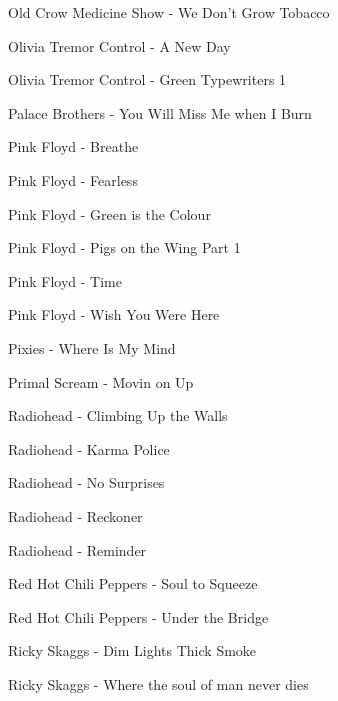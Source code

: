 Old Crow Medicine Show - We Don't Grow Tobacco \dotfill \pageref{We Don't Grow Tobacco - Old Crow Medicine Show} 

Olivia Tremor Control - A New Day \dotfill \pageref{A New Day - Olivia Tremor Control} 

Olivia Tremor Control - Green Typewriters 1 \dotfill \pageref{Green Typewriters 1 - Olivia Tremor Control} 

Palace Brothers - You Will Miss Me when I Burn \dotfill \pageref{You Will Miss Me when I Burn - Palace Brothers} 

Pink Floyd - Breathe \dotfill \pageref{Breathe - Pink Floyd} 

Pink Floyd - Fearless \dotfill \pageref{Fearless - Pink Floyd} 

Pink Floyd - Green is the Colour \dotfill \pageref{Green is the Colour - Pink Floyd} 

Pink Floyd - Pigs on the Wing Part 1 \dotfill \pageref{Pigs on the Wing Part 1 - Pink Floyd} 

Pink Floyd - Time \dotfill \pageref{Time - Pink Floyd} 

Pink Floyd - Wish You Were Here \dotfill \pageref{Wish You Were Here - Pink Floyd} 

Pixies - Where Is My Mind \dotfill \pageref{Where Is My Mind - Pixies} 

Primal Scream - Movin on Up \dotfill \pageref{Movin on Up - Primal Scream} 

Radiohead - Climbing Up the Walls \dotfill \pageref{Climbing Up the Walls - Radiohead} 

Radiohead - Karma Police \dotfill \pageref{Karma Police - Radiohead} 

Radiohead - No Surprises \dotfill \pageref{No Surprises - Radiohead} 

Radiohead - Reckoner \dotfill \pageref{Reckoner - Radiohead} 

Radiohead - Reminder \dotfill \pageref{Reminder - Radiohead} 

Red Hot Chili Peppers - Soul to Squeeze \dotfill \pageref{Soul to Squeeze - Red Hot Chili Peppers} 

Red Hot Chili Peppers - Under the Bridge \dotfill \pageref{Under the Bridge - Red Hot Chili Peppers} 

Ricky Skaggs - Dim Lights Thick Smoke \dotfill \pageref{Dim Lights Thick Smoke - Ricky Skaggs} 

Ricky Skaggs - Where the soul of man never dies \dotfill \pageref{Where the soul of man never dies - Ricky Skaggs} 

